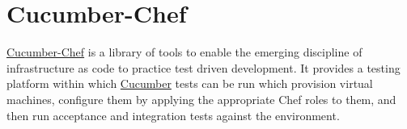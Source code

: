 \section{Cucumber-Chef}
\label{sec:testing-cucumber-spec}

\href{http://www.cucumber-chef.org/}{Cucumber-Chef} is a library of tools to enable the emerging discipline of infrastructure as code to practice test driven development. It provides a testing platform within which \href{http://cukes.info/}{Cucumber} tests can be run which provision virtual machines, configure them by applying the appropriate Chef roles to them, and then run acceptance and integration tests against the environment.

